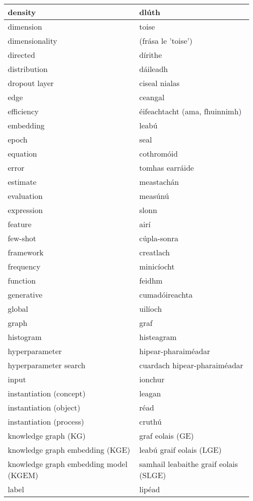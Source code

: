 \documentclass{article}
\begin{document}
\begin{longtable}{|l|l|}
		density&dlúth\\ \hline 
		dimension&toise\\ \hline 
		dimensionality&(frása le 'toise')\\ \hline 
		directed&dírithe\\ \hline 
		distribution&dáileadh\\ \hline 
		dropout layer&ciseal nialas\\ \hline 
		edge&ceangal\\ \hline 
		efficiency&éifeachtacht (ama, fhuinnimh)\\ \hline 
		embedding&leabú\\ \hline 
		epoch&seal\\ \hline 
		equation&cothromóid\\ \hline 
		error&tomhas earráide\\ \hline 
		estimate&meastachán\\ \hline 
		evaluation&measúnú\\ \hline 
		expression&slonn\\ \hline 
		feature&airí\\ \hline 
		few-shot&cúpla-sonra\\ \hline 
		framework&creatlach\\ \hline 
		frequency&minicíocht\\ \hline 
		function&feidhm\\ \hline 
		generative&cumadóireachta\\ \hline 
		global&uilíoch\\ \hline 
		graph&graf\\ \hline 
		histogram&histeagram\\ \hline 
		hyperparameter&hipear-pharaiméadar\\ \hline 
		hyperparameter search&cuardach hipear-pharaiméadar\\ \hline 
		input&ionchur\\ \hline 
		instantiation (concept)&leagan\\ \hline 
		instantiation (object)&réad\\ \hline 
		instantiation (process)&cruthú\\ \hline 
		knowledge graph (KG)&graf eolais (GE)\\ \hline 
		knowledge graph embedding (KGE)&leabú graif eolais (LGE)\\ \hline 
		knowledge graph embedding model (KGEM)&samhail leabaithe graif eolais (SLGE)\\ \hline 
		label&lipéad\\ \hline 

\end{longtable}
\end{document}
